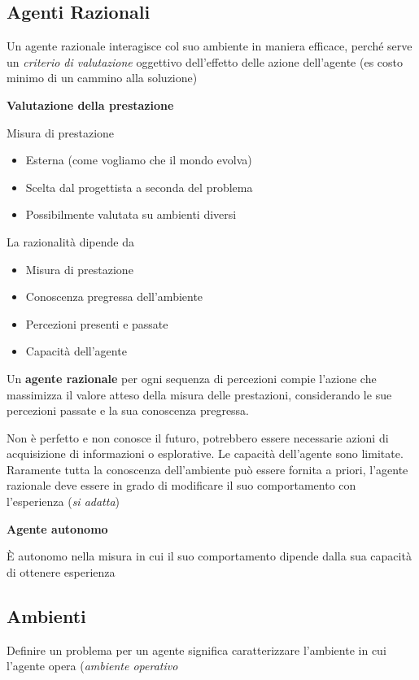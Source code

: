 \documentclass{article}
\begin{document}
\subsection{Agenti Razionali}
Un agente razionale interagisce col suo ambiente in maniera efficace, perché serve un \textit{criterio di valutazione} oggettivo dell'effetto delle azione dell'agente (es costo minimo di un cammino alla soluzione)


\textbf{Valutazione della prestazione}

Misura di prestazione
\begin{itemize}
    \item Esterna (come vogliamo che il mondo evolva)
    \item Scelta dal progettista a seconda del problema
    \item Possibilmente valutata su ambienti diversi
\end{itemize}
La razionalità dipende da
\begin{itemize}
    \item Misura di prestazione
    \item Conoscenza pregressa dell'ambiente
    \item Percezioni presenti e passate
    \item Capacità dell'agente
\end{itemize}
Un \textbf{agente razionale} per ogni sequenza di percezioni compie l'azione che massimizza il valore atteso della misura delle prestazioni, considerando le sue percezioni passate e la sua conoscenza pregressa.

Non è perfetto e non conosce il futuro, potrebbero essere necessarie azioni di acquisizione di informazioni o esplorative. Le capacità dell'agente sono limitate.
Raramente tutta la conoscenza dell'ambiente può essere fornita a priori, l'agente razionale deve essere in grado di modificare il suo comportamento con l'esperienza (\textit{si adatta})

\par \textbf{Agente autonomo}

È autonomo nella misura in cui il suo comportamento dipende dalla sua capacità di ottenere esperienza

\subsection{Ambienti}
Definire un problema per un agente significa caratterizzare l'ambiente in cui l'agente opera (\textit{ambiente operativo}
\end{document}
